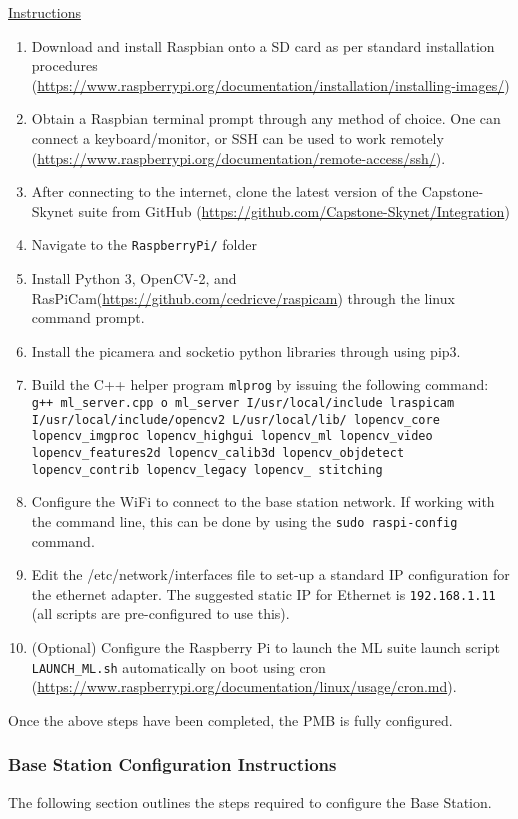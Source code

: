 \documentclass[10pt,letterpaper]{article}
\begin{document}
\underline{Instructions}
\begin{enumerate}
\item Download and install Raspbian onto a SD card as per standard installation procedures (\url{https://www.raspberrypi.org/documentation/installation/installing-images/})
\item Obtain a Raspbian terminal prompt through any method of choice. One can connect a keyboard/monitor, or SSH can be used to work remotely (\url{https://www.raspberrypi.org/documentation/remote-access/ssh/}).
\item After connecting to the internet, clone the latest version of the Capstone-Skynet suite from GitHub (\url{https://github.com/Capstone-Skynet/Integration})
\item Navigate to the \texttt{RaspberryPi/} folder
\item Install Python 3, OpenCV-2, and RasPiCam(\url{https://github.com/cedricve/raspicam}) through the linux command prompt. 
\item Install the picamera and socketio python libraries through using pip3.
\item Build the C++ helper program \texttt{mlprog} by issuing the following command: \texttt{g++ ml\_server.cpp \-o ml\_server \-I/usr/local/include \-lraspicam \-I/usr/local/include/opencv2 \-L/usr/local/lib/ \-lopencv\_core \-lopencv\_imgproc \-lopencv\_highgui \-lopencv\_ml \-lopencv\_video \-lopencv\_features2d \-lopencv\_calib3d \-lopencv\_objdetect \-lopencv\_contrib \-lopencv\_legacy \-lopencv\_ stitching}
\item Configure the WiFi to connect to the base station network. If working with the command line, this can be done by using the \texttt{sudo raspi-config} command.
\item Edit the /etc/network/interfaces file to set-up a standard IP configuration for the ethernet adapter. The suggested static IP for Ethernet is \texttt{192.168.1.11}  (all scripts are pre-configured to use this).
\item (Optional) Configure the Raspberry Pi to launch the ML suite launch script \texttt{LAUNCH\_ML.sh} automatically on boot using cron (\url{https://www.raspberrypi.org/documentation/linux/usage/cron.md}).
\end{enumerate}

Once the above steps have been completed, the PMB is fully configured.

\subsubsection{Base Station Configuration Instructions}
\label{bs_inst}
The following section outlines the steps required to configure the Base Station. 
\end{document}
